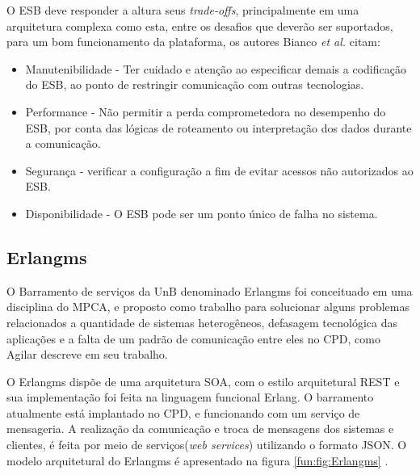 O \acrshort{ESB} deve responder a altura seus \textit{trade-offs},  principalmente em uma arquitetura complexa como esta, entre os desafios que deverão ser suportados, para um bom funcionamento da plataforma, os autores Bianco \textit{et al.} \cite{bianco2011architecting} citam:

\begin{itemize}

\item Manutenibilidade - Ter cuidado e atenção ao especificar demais a codificação do \acrshort{ESB}, ao ponto de restringir comunicação com outras tecnologias. 
 	
\item Performance - Não permitir a perda comprometedora no desempenho do \acrshort{ESB}, por conta das lógicas de roteamento ou interpretação dos dados durante a comunicação.

\item Segurança - verificar a configuração a fim de evitar acessos não autorizados ao \acrshort{ESB}.

\item Disponibilidade - O \acrshort{ESB} pode ser um ponto único de falha no sistema.

\end{itemize}


\subsection{Erlangms}
O Barramento de serviços da \acrshort{UnB} denominado Erlangms foi conceituado em uma disciplina do \acrshort{MPCA}, e proposto como trabalho para solucionar alguns problemas relacionados a quantidade de sistemas heterogêneos, defasagem tecnológica das aplicações e a falta de um padrão de comunicação entre eles no \acrshort{CPD}, como Agilar \cite{Agilar} descreve em seu trabalho. 

O Erlangms dispõe de uma arquitetura \acrshort{SOA}, com o estilo arquitetural \acrshort{REST} e sua implementação foi feita na linguagem funcional Erlang. O barramento atualmente está implantado no \acrshort{CPD}, e  funcionando com um serviço de mensageria. A realização da comunicação e troca de mensagens dos sistemas e clientes, é feita por meio de serviços(\textit{web services}) utilizando o formato \acrshort{JSON}. O modelo arquitetural do Erlangms é apresentado na figura \ref{fun:fig:Erlangms} .

